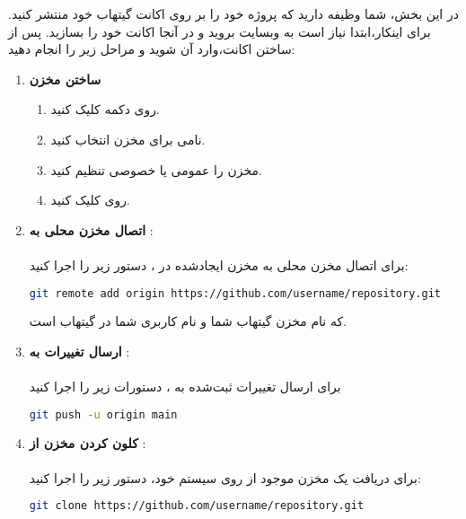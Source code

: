 
در این بخش، شما وظیفه دارید که پروژه خود را بر روی اکانت گیتهاب خود منتشر کنید. برای اینکار،ابتدا نیاز است به وبسایت \href{https://www.github.com}{} بروید و در آنجا اکانت خود را بسازید. پس از ساختن اکانت،وارد آن شوید و مراحل زیر را انجام دهید:

\begin{enumerate}
    \item \textbf{ساختن مخزن}
    \begin{enumerate}
        \item {روی دکمه  کلیک کنید.}
        \item {نامی برای مخزن انتخاب کنید.}
        \item {مخزن را عمومی یا خصوصی تنظیم کنید.}
        \item {روی   کلیک کنید.}
    \end{enumerate}
    \item \textbf{اتصال مخزن محلی به }:\\\\
    برای اتصال مخزن  محلی به مخزن ایجادشده در ، دستور زیر را اجرا کنید:
    
    \begin{terminal}
    \begin{lstlisting}[language=bash]
    git remote add origin https://github.com/username/repository.git
    \end{lstlisting}
    \end{terminal}

    که  نام مخزن گیتهاب شما و  نام کاربری شما در گیتهاب است.

    \item \textbf{ارسال تغییرات به }:\\\\
    برای ارسال تغییرات ثبت‌شده به ، دستورات زیر را اجرا کنید
    \begin{terminal}
    \begin{lstlisting}[language=bash]
    git push -u origin main
    \end{lstlisting}
    \end{terminal}  
    
    \item \textbf{کلون کردن مخزن از }:\\\\
    برای دریافت یک مخزن موجود از  روی سیستم خود، دستور زیر را اجرا کنید:
    \begin{terminal}
    \begin{lstlisting}[language=bash]
    git clone https://github.com/username/repository.git
    \end{lstlisting}
    \end{terminal} 


\end{enumerate}
